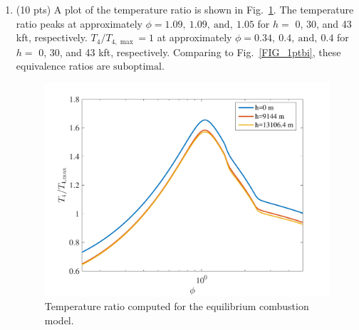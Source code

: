 \documentclass[12pt]{article}
\begin{document}
\begin{enumerate}[label=(\alph*)]
\begin{enumerate}[label=(\roman*)]
\begin{figure}[!t!]
					\end{figure}
				\item (10 pts)
					A plot of the temperature ratio is shown in Fig.~\ref{FIG_1ptbii}. The temperature ratio peaks at approximately $\boxed{\phi=1.09,\ 1.09,\ \mathrm{and},\ 1.05}$ for $h=$ 0, 30, and 43 kft, respectively. $T_4/T_{4,\max}=1$ at approximately $\boxed{\phi=0.34,\ 0.4,\ \mathrm{and},\ 0.4}$ for $h=$ 0, 30, and 43 kft, respectively. Comparing to Fig.~\ref{FIG_1ptbi}, these equivalence ratios are $\boxed{\mathrm{suboptimal}}$.
					\begin{figure}[!t!]
						\begin{center}
							\includegraphics[width=120mm]{problem1ptbii.pdf}
							\caption{\label{FIG_1ptbii} Temperature ratio computed for the equilibrium combustion model.}
						\end{center}
					\end{figure}
			\end{enumerate}
	\end{enumerate}
\end{document}
